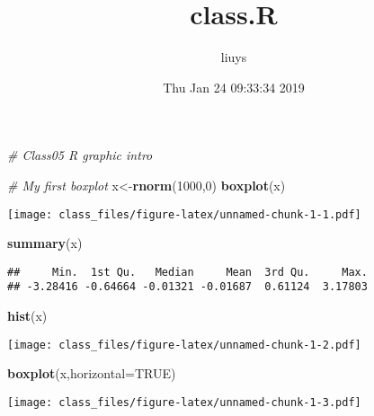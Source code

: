 \documentclass[]{article}
\title{class.R}
\author{liuys}
\date{Thu Jan 24 09:33:34 2019}
\newenvironment{Shaded}{\begin{snugshade}}{\end{snugshade}}
\newcommand{\KeywordTok}[1]{\textcolor[rgb]{0.13,0.29,0.53}{\textbf{#1}}}
\newcommand{\DataTypeTok}[1]{\textcolor[rgb]{0.13,0.29,0.53}{#1}}
\newcommand{\DecValTok}[1]{\textcolor[rgb]{0.00,0.00,0.81}{#1}}
\newcommand{\CommentTok}[1]{\textcolor[rgb]{0.56,0.35,0.01}{\textit{#1}}}
\newcommand{\OtherTok}[1]{\textcolor[rgb]{0.56,0.35,0.01}{#1}}
\newcommand{\NormalTok}[1]{#1}
\begin{document}
\maketitle

\begin{Shaded}
\begin{Highlighting}[]
\CommentTok{# Class05 R graphic intro}

\CommentTok{# My first boxplot}
\NormalTok{x<-}\KeywordTok{rnorm}\NormalTok{(}\DecValTok{1000}\NormalTok{,}\DecValTok{0}\NormalTok{)}
\KeywordTok{boxplot}\NormalTok{(x)}
\end{Highlighting}
\end{Shaded}

\texttt{[image: class\_files/figure-latex/unnamed-chunk-1-1.pdf]}

\begin{Shaded}
\begin{Highlighting}[]
\KeywordTok{summary}\NormalTok{(x)}
\end{Highlighting}
\end{Shaded}

\begin{verbatim}
##     Min.  1st Qu.   Median     Mean  3rd Qu.     Max. 
## -3.28416 -0.64664 -0.01321 -0.01687  0.61124  3.17803
\end{verbatim}

\begin{Shaded}
\begin{Highlighting}[]
\KeywordTok{hist}\NormalTok{(x)}
\end{Highlighting}
\end{Shaded}

\texttt{[image: class\_files/figure-latex/unnamed-chunk-1-2.pdf]}

\begin{Shaded}
\begin{Highlighting}[]
\KeywordTok{boxplot}\NormalTok{(x,}\DataTypeTok{horizontal=}\OtherTok{TRUE}\NormalTok{)}
\end{Highlighting}
\end{Shaded}

\texttt{[image: class\_files/figure-latex/unnamed-chunk-1-3.pdf]}
\end{document}
